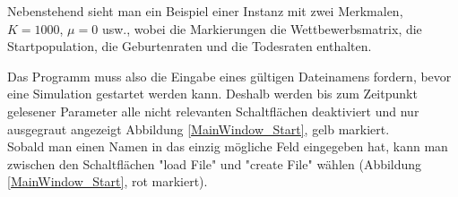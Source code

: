 \documentclass[11pt, a4paper, german]{article}
\theoremstyle{plain}
\begin{document}
\begin{center}
\begin{minipage}{0.6\textwidth}
		Nebenstehend sieht man ein Beispiel einer Instanz mit zwei Merkmalen, $ K = 1000 $, $ \mu = 0 $ usw., wobei die Markierungen die Wettbewerbsmatrix, die Startpopulation, die Geburtenraten und die Todesraten enthalten.\\
	\end{minipage}
	\end{center}
	
	Das Programm muss also die Eingabe eines gültigen Dateinamens fordern, bevor eine Simulation gestartet werden kann. Deshalb werden bis zum Zeitpunkt gelesener Parameter alle nicht relevanten Schaltflächen deaktiviert und nur ausgegraut angezeigt Abbildung \ref{MainWindow_Start}, gelb markiert.\\
	Sobald man einen Namen in das einzig mögliche Feld eingegeben hat, kann man zwischen den Schaltflächen "{}load File"{} und "{}create File"{} wählen (Abbildung \ref{MainWindow_Start}, rot markiert).\\
	
\end{document}
